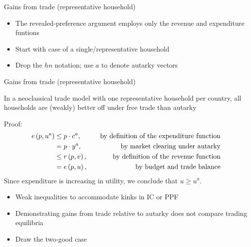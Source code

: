 \documentclass[10pt,notes=hide]{beamer}
\begin{document}
\begin{frame}{Gains from trade (representative household)}
\begin{itemize}
	\item The revealed-preference argument employs only the revenue and expenditure funtions
	\item Start with case of a single/representative household
	\item Drop the $hn$ notation; use $a$ to denote autarky vectors
\end{itemize}
\end{frame}
\begin{frame}{Gains from trade (representative household)}
\begin{proposition}
In a neoclassical trade model with one representative household per country,
all households are (weakly) better off under free trade than autarky
\end{proposition}
Proof:
\begin{align*}
e\left( p,u^{a}\right) &\leq p \cdot c^{a} , &\text{\quad by definition of the expenditure function} \\
&=p \cdot y^{a} , &\text{\quad by market clearing under autarky} \\
&\leq r\left( p,v\right)  , &\text{\quad by definition of the revenue function} \\
&=e\left( p,u\right)  , &\text{\quad by budget and trade balance}
\end{align*}
Since expenditure is increasing in utility, we conclude that $u \geq u^a$.\\
\begin{itemize}
	\item Weak inequalities to accommodate kinks in IC or PPF
	\item Demonstrating gains from trade relative to autarky does not compare trading equilibria
	\item Draw the two-good case
\end{itemize}
\end{frame}
\end{document}
